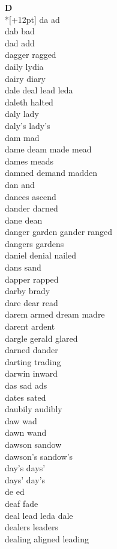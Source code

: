 \vspace{14pt}
\noindent\textbf{\Large D}\\*[+12pt]
da ad\\
dab bad\\
dad add\\
dagger ragged\\
daily lydia\\
dairy diary\\
dale deal lead leda\\
daleth halted\\
daly lady\\
daly's lady's\\
dam mad\\
dame deam made mead\\
dames meads\\
damned demand madden\\
dan and\\
dances ascend\\
dander darned\\
dane dean\\
danger garden gander ranged\\
dangers gardens\\
daniel denial nailed\\
dans sand\\
dapper rapped\\
darby brady\\
dare dear read\\
darem armed dream madre\\
darent ardent\\
dargle gerald glared\\
darned dander\\
darting trading\\
darwin inward\\
das sad ads\\
dates sated\\
daubily audibly\\
daw wad\\
dawn wand\\
dawson sandow\\
dawson's sandow's\\
day's days'\\
days' day's\\
de ed\\
deaf fade\\
deal lead leda dale\\
dealers leaders\\
dealing aligned leading\\
